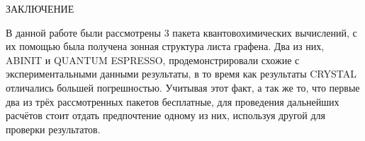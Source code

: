 \begin{center}
    ЗАКЛЮЧЕНИЕ
\end{center}

В данной работе были рассмотрены 3 пакета квантовохимических вычислений, с их помощью была получена зонная структура листа графена. Два из них, ABINIT и QUANTUM ESPRESSO, продемонстрировали схожие с экспериментальными данными результаты, в то время как результаты CRYSTAL отличались большей погрешностью. Учитывая этот факт, а так же то, что первые два из трёх рассмотренных пакетов бесплатные, для проведения дальнейших расчётов стоит отдать предпочтение одному из них, используя другой для проверки результатов.
